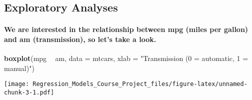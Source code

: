 \documentclass[]{article}
\newenvironment{Shaded}{\begin{snugshade}}{\end{snugshade}}
\newcommand{\DataTypeTok}[1]{\textcolor[rgb]{0.13,0.29,0.53}{#1}}
\newcommand{\KeywordTok}[1]{\textcolor[rgb]{0.13,0.29,0.53}{\textbf{#1}}}
\newcommand{\NormalTok}[1]{#1}
\newcommand{\OperatorTok}[1]{\textcolor[rgb]{0.81,0.36,0.00}{\textbf{#1}}}
\newcommand{\StringTok}[1]{\textcolor[rgb]{0.31,0.60,0.02}{#1}}
\let\oldparagraph\paragraph
\renewcommand{\paragraph}[1]{\oldparagraph{#1}\mbox{}}
\begin{document}
\begin{Shaded}
\end{Shaded}

\hypertarget{exploratory-analyses}{%
\subsection{Exploratory Analyses}\label{exploratory-analyses}}

\hypertarget{we-are-interested-in-the-relationship-between-mpg-miles-per-gallon-and-am-transmission-so-lets-take-a-look.}{%
\paragraph{We are interested in the relationship between mpg (miles per
gallon) and am (transmission), so let's take a
look.}\label{we-are-interested-in-the-relationship-between-mpg-miles-per-gallon-and-am-transmission-so-lets-take-a-look.}}

\begin{Shaded}
\begin{Highlighting}[]
\KeywordTok{boxplot}\NormalTok{(mpg }\OperatorTok{~}\StringTok{ }\NormalTok{am, }\DataTypeTok{data =}\NormalTok{ mtcars, }\DataTypeTok{xlab =} \StringTok{"Transmission (0 = automatic, 1 = manual)"}\NormalTok{)}
\end{Highlighting}
\end{Shaded}

\texttt{[image: Regression\_Models\_Course\_Project\_files/figure-latex/unnamed-chunk-3-1.pdf]}
\end{document}
